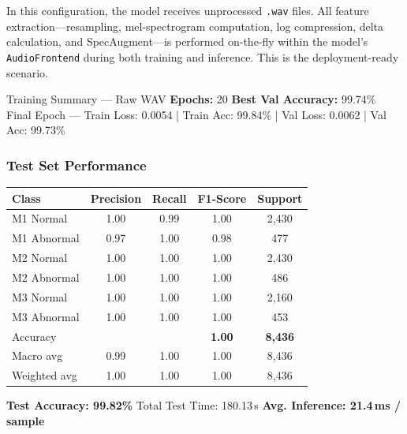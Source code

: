 \documentclass[12pt,a4paper]{article}
\begin{document}
In this configuration, the model receives unprocessed \texttt{.wav} files. All feature extraction—resampling, mel-spectrogram computation, log compression, delta calculation, and SpecAugment—is performed on-the-fly within the model's \texttt{AudioFrontend} during both training and inference. This is the deployment-ready scenario.

\begin{resultbox}{Training Summary — Raw WAV}
  \textbf{Epochs:} 20 \quad
  \textbf{Best Val Accuracy:} 99.74\% \\[4pt]
  Final Epoch — Train Loss: 0.0054 \;|\; Train Acc: 99.84\% \;|\; Val Loss: 0.0062 \;|\; Val Acc: 99.73\%
\end{resultbox}

\subsubsection{Test Set Performance}

\begin{center}
\renewcommand{\arraystretch}{1.3}
\begin{tabular}{lcccc}
  \toprule
  \textbf{Class} & \textbf{Precision} & \textbf{Recall} & \textbf{F1-Score} & \textbf{Support} \\
  \midrule
  M1 Normal   & 1.00 & 0.99 & 1.00 & 2{,}430 \\
  M1 Abnormal & 0.97 & 1.00 & 0.98 &   477   \\
  M2 Normal   & 1.00 & 1.00 & 1.00 & 2{,}430 \\
  M2 Abnormal & 1.00 & 1.00 & 1.00 &   486   \\
  M3 Normal   & 1.00 & 1.00 & 1.00 & 2{,}160 \\
  M3 Abnormal & 1.00 & 1.00 & 1.00 &   453   \\
  \midrule
  Accuracy    &      &      & \textbf{1.00} & \textbf{8{,}436} \\
  Macro avg   & 0.99 & 1.00 & 1.00 & 8{,}436 \\
  Weighted avg& 1.00 & 1.00 & 1.00 & 8{,}436 \\
  \bottomrule
\end{tabular}
\end{center}

\begin{highlightbox}
  \centering
  \large
  \textbf{Test Accuracy: 99.82\%} \quad
  Total Test Time: 180.13\,s \quad
  \textbf{Avg. Inference: 21.4\,ms / sample}
\end{highlightbox}
\end{document}
